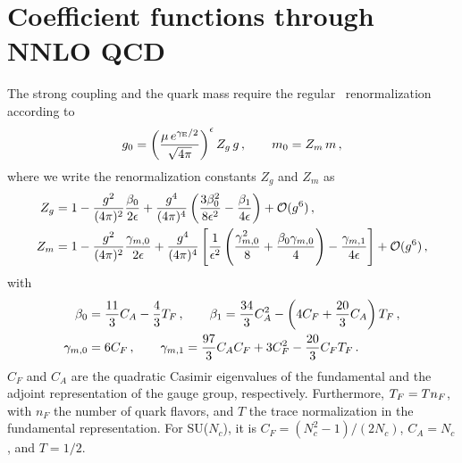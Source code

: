 \section{Coefficient functions through NNLO QCD}\label{sec:coefs}

The strong coupling and the quark mass require the regular
\qcd\ renormalization according to
\begin{equation}
  \begin{split}
    g_0 = \left( \frac{\mu \, e^{\gamma_\text{E} / 2}}{\sqrt{4 \pi}}
    \right)^\epsilon Z_g\,g\,,\qquad m_0 = Z_m\,m\,,
    \label{eq:msbar}
  \end{split}
\end{equation}
where we write the renormalization constants $Z_g$ and $Z_m$ as
\begin{equation}
  \begin{split}
    Z_g &=
    1 - \gcoup{2}\frac{\beta_0}{2\ep} +
    \gcoup{4}\left(\frac{3\beta_0^2}{8\ep^2}
    -\frac{\beta_1}{4\ep}\right)   + \order{g^6}\,,
    \\
    Z_m &=
    1
    -\gcoup{2}\frac{\gamma_{m,0}}{2\ep}
    +\gcoup{4}\left[\frac{1}{\ep^2}\left(
      \frac{\gamma_{m,0}^2}{8} + \frac{\beta_0\gamma_{m,0}}{4}\right)
      -\frac{\gamma_{m,1}}{4\ep}\right] + \order{g^6}\,,
    \label{eq:rgconsts}
  \end{split}
\end{equation}
with
\begin{equation}
  \begin{split}
      \beta_0 &= \frac{11}{3} C_A - \frac{4}{3} T_F\,, \qquad
      \beta_1 = \frac{34}{3} C_A^2 - \left( 4 C_F + \frac{20}{3} C_A
      \right) T_F \,,\\
      \gamma_{m,0} &= 6 C_F\,,\qquad
      \gamma_{m,1} = \frac{97}{3} C_A C_F + 3 C_F^2
      - \frac{20}{3} C_F T_F \,.
    \label{eq:anombg}
  \end{split}
\end{equation}
$C_F$ and $C_A$ are the quadratic Casimir eigenvalues of the fundamental
and the adjoint representation of the gauge group,
respectively. Furthermore, $T_F=Tn_F$, with $n_F$ the number of quark
flavors, and $T$ the trace normalization in the fundamental
representation. For SU($N_c$), it is $C_F=(N_c^2-1)/(2N_c)$, $C_A=N_c$,
and $T=1/2$.

